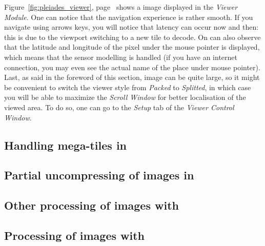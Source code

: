 Figure~\ref{fig:pleiades_viewer}, page~\pageref{fig:pleiades_viewer}
shows a \phr image displayed in the \textit{Viewer Module}. One can
notice that the navigation experience is rather smooth. If you
navigate using arrows keys, you will notice that latency can occur now
and then: this is due to the viewport switching to a new \jpg tile to
decode. On can also observe that the latitude and longitude of the
pixel under the mouse pointer is displayed, which means that the
sensor modelling is handled (if you have an internet connection, you
may even see the actual name of the place under mouse
pointer). Last, as said in the foreword of this section, \phr image
can be quite large, so it might be convenient to switch the viewer
style from \textit{Packed} to \textit{Splitted}, in which case you
will be able to maximize the \textit{Scroll Window} for better
localisation of the viewed area. To do so, one can go to
the \textit{Setup} tab of the \textit{Viewer Control Window}.

\subsection{Handling mega-tiles in \mont}

\subsection{Partial uncompressing of \phr images in \mont}

\subsection{Other processing of \phr images with \mont}

\subsection{Processing of \phr images with \app}
